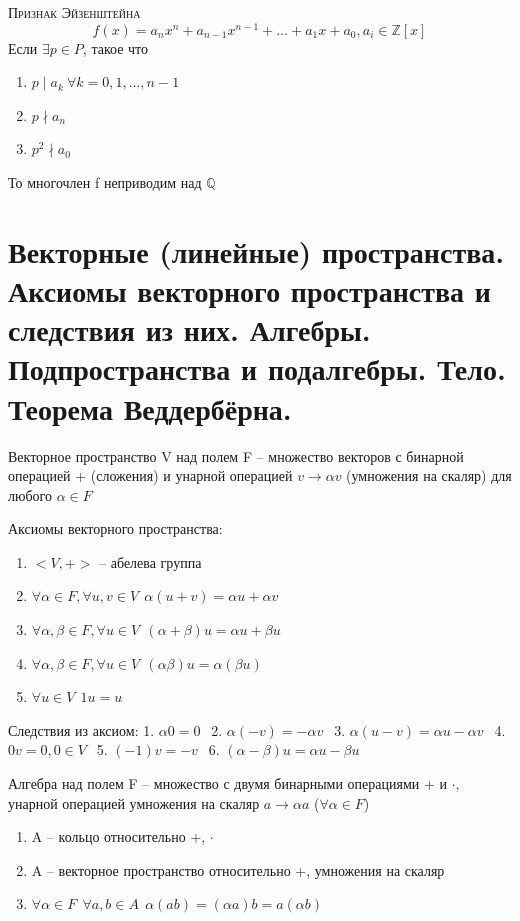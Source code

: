 \documentclass{article}
\begin{document}
\textsc{Признак Эйзенштейна}
$$f(x)=a_nx^n+a_{n-1}x^{n-1}+\dots+a_1x+a_0, a_i\in \mathbb{Z}[x]$$
Если $\exists p\in P$, такое что
\begin{enumerate}
    \item $p\mid a_k\ \forall k=0,1,\dots,n-1$
    \item $p\nmid a_n$
    \item $p^2\nmid a_0$
\end{enumerate}
То многочлен f неприводим над $\mathbb{Q}$

\section{Векторные (линейные) пространства. Аксиомы векторного пространства и следствия из них. Алгебры. Подпространства и подалгебры. Тело. Теорема Веддербёрна.}

\textsf{Векторное пространство V над полем F – множество векторов с бинарной операцией + (сложения) и унарной операцией $v\to\alpha v$ (умножения на скаляр) для любого $\alpha\in F$}

Аксиомы векторного пространства:
\begin{enumerate}
    \item $<V, +>$ – абелева группа
    \item $\forall\alpha\in F, \forall u,v\in V\ \ \alpha(u+v)=\alpha u+\alpha v$
    \item $\forall\alpha,\beta\in F, \forall u\in V\ \ (\alpha+\beta)u=\alpha u+\beta u$
    \item $\forall\alpha,\beta\in F, \forall u\in V\ \ (\alpha\beta)u=\alpha(\beta u)$
    \item $\forall u\in V\ \ 1u=u$
\end{enumerate}

Следствия из аксиом:
1. $\alpha 0=0\ \ $
2. $\alpha (-v)=-\alpha v\ \ $
3. $\alpha(u-v)=\alpha u-\alpha v\ \ $
4. $0v=0, 0\in V\ \ $
5. $(-1)v=-v\ \ $
6. $(\alpha-\beta)u=\alpha u-\beta u$

\textsf{Алгебра} над полем F – множество с двумя бинарными операциями + и $\cdot$, унарной операцией умножения на скаляр $a\to\alpha a$ ($\forall\alpha\in F$)
\begin{enumerate}
    \item A – кольцо относительно +, $\cdot$
    \item A – векторное пространство относительно +, умножения на скаляр
    \item $\forall\alpha\in F\ \ \forall a,b\in A\ \ \alpha(ab)=(\alpha a)b=a(\alpha b)$
\end{enumerate}
\end{document}
